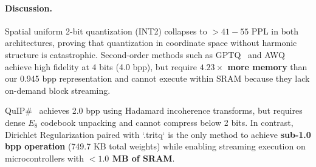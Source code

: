 \documentclass[11pt,a4paper]{article}
\begin{document}
\begin{table}[t]
    \centering
    \small
    \caption{\textbf{Comprehensive SOTA Quantization Comparison (TinyStories 10M, 10,000 steps).}}
    \label{tab:sota}
\end{table}

\paragraph{Discussion.}
Spatial uniform 2-bit quantization (INT2) collapses to $>41-55$ PPL in both architectures, proving that quantization in coordinate space without harmonic structure is catastrophic. Second-order methods such as GPTQ~\citep{frantar2022gptq} and AWQ~\citep{lin2023awq} achieve high fidelity at 4 bits (4.0 bpp), but require \textbf{$4.23\times$ more memory} than our 0.945 bpp representation and cannot execute within SRAM because they lack on-demand block streaming. 

QuIP\#~\citep{chee2024quip} achieves 2.0 bpp using Hadamard incoherence transforms, but requires dense $E_8$ codebook unpacking and cannot compress below 2 bits. In contrast, Dirichlet Regularization paired with `.tritq` is the only method to achieve \textbf{sub-1.0 bpp operation} (749.7 KB total weights) while enabling streaming execution on microcontrollers with \textbf{$<1.0$ MB of SRAM}.
\end{document}
